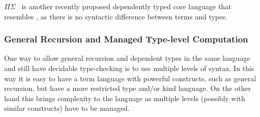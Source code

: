$\Pi\Sigma$~\cite{dep:pisigma} is another recently proposed
dependently typed core language that resembles \name, as there is no
syntactic difference between terms and types.

\subsubsection{General Recursion and Managed Type-level Computation}

One way to allow general recursion and dependent types in the same
language and still have decidable type-checking is to use multiple
levels of syntax. In this way it is easy to have a term language with 
powerful constructs, such as general recursion, but have a more
restricted type and/or kind language. On the other hand this brings 
complexity to the language as multiple levels (possibly with similar
constructs) have to be managed.


\begin{comment}
As discussed in \S\ref{sec:rec}, bringing general
recursion blindly into the dependently typed world causes more trouble
than convenience. There are many dependently typed languages that
allow general recursion. Zombie approaches general recursion by
separating a consistent sub-language, in which all expressions are
known to terminate, from a programmatic language that supports general
recursion. What is interesting about Zombie is that those two
seemingly conflicting worlds can interact with each other nicely,
without compromising the consistency property. The key idea of this is
to distinguish between these two fragments by using a
\emph{consistency classifier $\theta$}. When $\theta$ is \textsf{L},
it means the logical part, and \textsf{P} the program part. Like
\name, Zombie uses \textsf{roll} and \textsf{unroll} for iso-recursive
types. To ensure normalization (in order for decidable type checking),
it forbids the use of \textsf{unroll} in \textsf{P}, where the
potential non-termination could arise.\bruno{Zombie is being discussed
in two different places.}
\end{comment}

